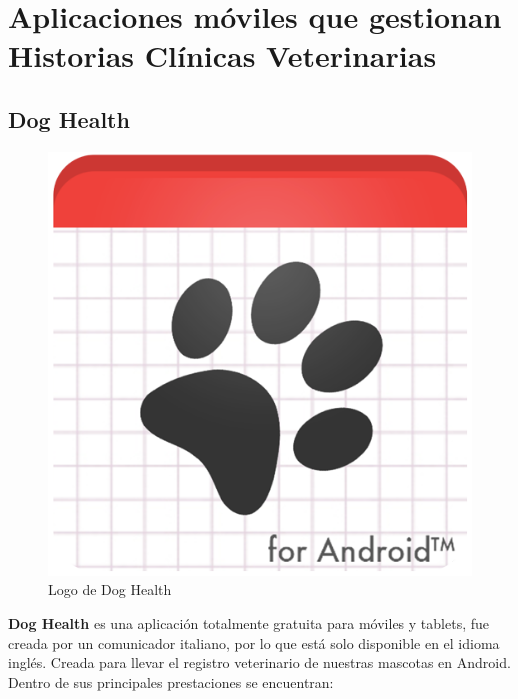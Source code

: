 \section{Aplicaciones móviles que gestionan Historias Clínicas Veterinarias}\label{chapter:introduction}

\subsection{Dog Health}\label{chapter:introduction}

\begin{figure}[h!]
\begin{center}
\includegraphics[scale=0.12]{Graphics/images/LogodeDogHealth.png}
\caption{Logo de Dog Health}
\label{fig:dh}

\end{center}
\end{figure}


\textbf{Dog Health} es una aplicación totalmente gratuita para móviles y tablets, fue creada por un comunicador italiano, por lo que está solo disponible en el idioma inglés. Creada para llevar el registro veterinario de nuestras mascotas en Android. Dentro de sus principales prestaciones se encuentran:

